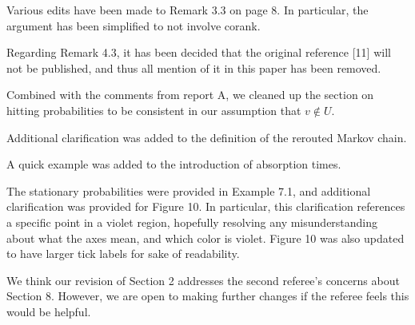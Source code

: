 \documentclass[12pt]{amsart}
\begin{document}
Various edits have been made to Remark 3.3 on page 8.
In particular, the argument has been simplified to not involve corank.

Regarding Remark 4.3, it has been decided that the original reference [11] 
will not be published, and thus all mention of it in this paper has been removed.

Combined with the comments from report A, we cleaned up the section on hitting
probabilities to be consistent in our assumption that $v\not\in U$.

Additional clarification was added to the definition of the rerouted Markov 
chain.

A quick example was added to the introduction of absorption times.

The stationary probabilities were provided in Example 7.1, and additional 
clarification was provided for Figure 10.
In particular, this clarification references a specific point in a 
violet region, hopefully resolving any misunderstanding about what 
the axes mean, and which color is violet.
Figure 10 was also updated to have larger tick labels for sake of readability.

We think our revision of Section 2 addresses the second referee’s concerns about Section 8. However, we are open to making further changes if the referee feels this would be helpful.
\end{document}
